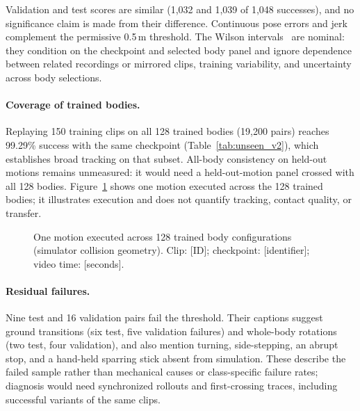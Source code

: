 Validation and test scores are similar (1,032 and 1,039 of 1,048 successes),
and no significance claim is made from their difference. Continuous pose errors
and jerk complement the permissive 0.5\,m threshold. The Wilson
intervals~\cite{wilson1927} are nominal: they condition on the checkpoint and
selected body panel and ignore dependence between related recordings or
mirrored clips, training variability, and uncertainty across body selections.

\paragraph{Coverage of trained bodies.}
Replaying 150 training clips on all 128 trained bodies (19,200 pairs) reaches
99.29\% success with the same checkpoint (Table~\ref{tab:unseen_v2}), which
establishes broad tracking on that subset. All-body consistency on held-out
motions remains unmeasured: it would need a held-out-motion panel crossed with
all 128 bodies. Figure~\ref{fig:trained_multibody_demo} shows one motion executed
across the 128 trained bodies; it illustrates execution and does not quantify
tracking, contact quality, or transfer.

\begin{figure}[t]
\centering
{}
\caption{One motion executed across 128 trained body configurations (simulator
collision geometry). Clip: [ID]; checkpoint: [identifier]; video time:
[seconds].}
\label{fig:trained_multibody_demo}
\end{figure}

\paragraph{Residual failures.}\label{sec:failures}
Nine test and 16 validation pairs fail the threshold. Their captions suggest
ground transitions (six test, five validation failures) and whole-body
rotations (two test, four validation), and also mention turning, side-stepping,
an abrupt stop, and a hand-held sparring stick absent from simulation. These
describe the failed sample rather than mechanical causes or class-specific
failure rates; diagnosis would need synchronized rollouts and first-crossing
traces, including successful variants of the same clips.

